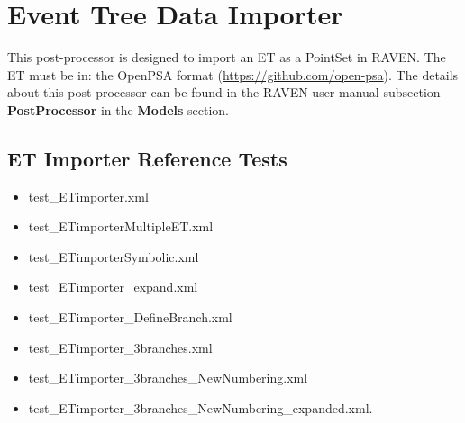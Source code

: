 \section{Event Tree Data Importer}
\label{sec:ETdataImporter}

This post-processor is designed to import an ET as a PointSet in RAVEN.
The ET must be in: the OpenPSA format (\href{<url>}{https://github.com/open-psa}).
The details about this post-processor can be found in the RAVEN user manual subsection \textbf{PostProcessor}
in the \textbf{Models} section.

\subsection{ET Importer Reference Tests}
\begin{itemize}
	\item test\_ETimporter.xml
	\item test\_ETimporterMultipleET.xml
	\item test\_ETimporterSymbolic.xml
	\item test\_ETimporter\_expand.xml
	\item test\_ETimporter\_DefineBranch.xml
	\item test\_ETimporter\_3branches.xml
	\item test\_ETimporter\_3branches\_NewNumbering.xml
	\item test\_ETimporter\_3branches\_NewNumbering\_expanded.xml.
\end{itemize}
